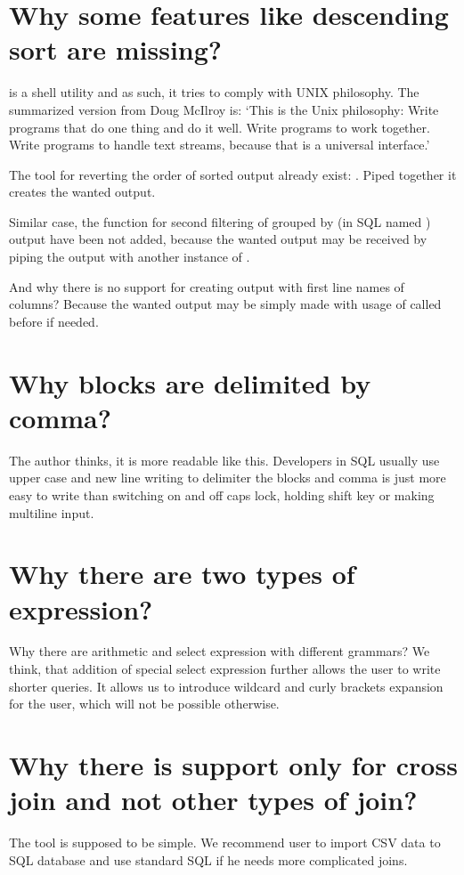 \section{Why some features like descending sort are missing?}
 is a shell utility and as such, it tries to comply with UNIX philosophy. 
The summarized version from Doug McIlroy is: `This is the Unix philosophy: Write programs that do one thing and do it well. Write programs to work together. Write programs to handle text streams, because that is a universal interface.' \cite{unix-philosophy}

The tool for reverting the order of sorted output already exist: . Piped together it creates the wanted output.

Similar case, the function for second filtering of grouped by (in SQL named ) 
output have been not added, because the wanted output
may be received by piping the output with another instance of .

And why there is no support for creating output with first line names of columns? Because the wanted output
may be simply made with usage of  called before  if needed.

\section{Why blocks are delimited by comma?}
The author thinks, it is more readable like this. Developers in SQL usually use upper case and new line writing to delimiter the blocks and comma is just more easy to write than switching on and off caps lock, holding shift key or making multiline input.

\section{Why there are two types of expression?}
Why there are arithmetic and select expression with different grammars?
We think, that addition of special select expression further allows the user to write shorter queries.
It allows us to introduce wildcard and curly brackets expansion for the user, which will not be possible otherwise.

\section{Why there is support only for cross join and not other types of join?}
The tool is supposed to be simple. We recommend user to import CSV data to SQL database and use standard SQL if he needs more complicated joins.

